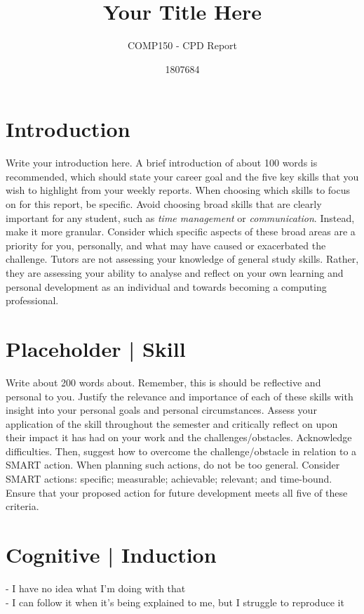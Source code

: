 \documentclass{scrartcl}
\title{Your Title Here}
\subtitle{COMP150 - CPD Report}
\author{1807684}
\begin{document}
\maketitle

\section{Introduction}

Write your introduction here. A brief introduction of about 100 words is recommended, which should state your career goal and the five key skills that you wish to highlight from your weekly reports. When choosing which skills to focus on for this report, be specific. Avoid choosing broad skills that are clearly important for any student, such as \textit{time management} or \textit{communication}. Instead, make it more granular. Consider which specific aspects of these broad areas are a priority for you, personally, and what may have caused or exacerbated the challenge. Tutors are not assessing your knowledge of general study skills. Rather, they are assessing your ability to analyse and reflect on your own learning and personal development as an individual and towards becoming a computing professional.

\section{Placeholder | Skill}

Write about 200 words about. Remember, this is should be reflective and personal to you. Justify the relevance and importance of each of these skills with insight into your personal goals and personal circumstances. Assess your application of the skill throughout the semester and critically reflect on upon their impact it has had on your work and the challenges/obstacles. Acknowledge difficulties. Then, suggest how to overcome the challenge/obstacle in relation to a SMART action. When planning such actions, do not be too general. Consider SMART actions:
specific; measurable; achievable; relevant; and time-bound. Ensure that your proposed action for future development meets all five of these criteria.\cite{shannon} %

\section{Cognitive | Induction}
- I have no idea what I'm doing with that\\
- I can follow it when it's being explained to me, but I struggle to reproduce it\\
\end{document}
